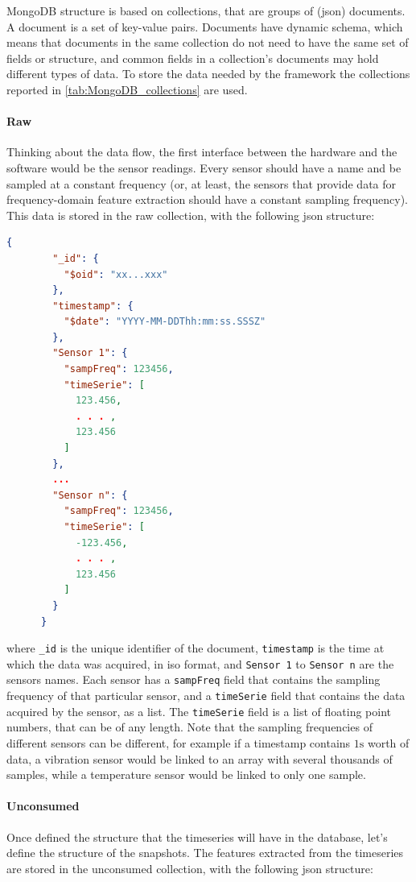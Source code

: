 MongoDB structure is based on collections, that are groups of (\gls{json}) documents. A document is a set of key-value pairs. Documents have dynamic schema, which means that documents in the same collection do not need to have the same set of fields or structure, and common fields in a collection's documents may hold different types of data. To store the data needed by the framework the collections reported in \autoref{tab:MongoDB_collections} are used.

\paragraph{Raw}
Thinking about the data flow, the first interface between the hardware and the software would be the sensor readings. Every sensor should have a name and be sampled at a constant frequency (or, at least, the sensors that provide data for frequency-domain feature extraction should have a constant sampling frequency). This data is stored in the {raw} collection, with the following \gls{json} structure:
\begin{lstlisting}[language=json,firstnumber=1]
    {
        "_id": {
          "$oid": "xx...xxx"
        },
        "timestamp": {
          "$date": "YYYY-MM-DDThh:mm:ss.SSSZ"
        },
        "Sensor 1": {
          "sampFreq": 123456,
          "timeSerie": [
            123.456,
            . . . ,
            123.456
          ]
        },
        ...
        "Sensor n": {
          "sampFreq": 123456,
          "timeSerie": [
            -123.456,
            . . . ,
            123.456
          ]
        }
      }
\end{lstlisting}
where \texttt{\_id} is the unique identifier of the document, \texttt{timestamp} is the time at which the data was acquired, in \gls{iso} format, and \texttt{Sensor 1} to \texttt{Sensor n} are the sensors names. Each sensor has a \texttt{sampFreq} field that contains the sampling frequency of that particular sensor, and a \texttt{timeSerie} field that contains the data acquired by the sensor, as a list. The \texttt{timeSerie} field is a list of floating point numbers, that can be of any length. Note that the sampling frequencies of different sensors can be different, for example if a timestamp contains $1\si{\s}$ worth of data, a vibration sensor would be linked to an array with several thousands of samples, while a temperature sensor would be linked to only one sample.

\paragraph{Unconsumed}
Once defined the structure that the timeseries will have in the database, let's define the structure of the snapshots. The features extracted from the timeseries are stored in the {unconsumed} collection, with the following \gls{json} structure:

